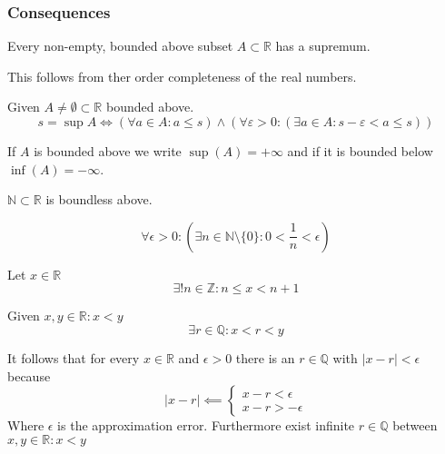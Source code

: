\subsubsection{Consequences}
\begin{proposition}\label{pro:supremum}
   Every non-empty, bounded above subset \(A \subset \mathbb{R}\) has a supremum.
\end{proposition}
\begin{remark}
   This follows from ther order completeness of the real numbers.
\end{remark}

\begin{proposition}\label{pro:supremum_epsilon}
   Given \(A \neq \emptyset \subset \mathbb{R}\) bounded above.
   \[s = \sup A \iff (\forall a \in A: a \leq s) \land (\forall \varepsilon > 0: (\exists a \in A: s - \varepsilon < a \leq s))\]
\end{proposition}
\begin{remark}
   If \(A\) is bounded above we write \(\sup(A) = +\infty\) and if it is bounded below \(\inf(A) = -\infty\).
\end{remark}

\begin{theorem}\label{thm:archimedes}
   \(\mathbb{N} \subset \mathbb{R}\) is boundless above.
\end{theorem}

\begin{corollary}\label{cor:arch}
   \[\forall \epsilon > 0: \left(\exists n \in \mathbb{N} \setminus \{0\}: 0 < \frac{1}{n} < \epsilon \right)\]
\end{corollary}

\begin{proposition}\label{pro:surrounding_n}
   Let \(x \in \mathbb{R}\)
   \[\exists! n \in \mathbb{Z}: n \leq x < n + 1\]
\end{proposition}

\begin{proposition}\label{pro:Q_density}
   Given \(x, y \in \mathbb{R}: x < y\)
   \[\exists r \in \mathbb{Q}: x < r < y\]
\end{proposition}
\begin{remark}
   It follows that for every \(x \in \mathbb{R}\) and \(\epsilon > 0\) there is an \(r \in \mathbb{Q}\) with \(|x - r| < \epsilon\) because
   \[|x - r| \impliedby \begin{cases} x - r < \epsilon\\ x - r > - \epsilon \end{cases}\]
   Where \(\epsilon\) is the approximation error.
   Furthermore exist infinite \(r \in \mathbb{Q}\) between \(x, y \in \mathbb{R}: x < y\)
\end{remark}


